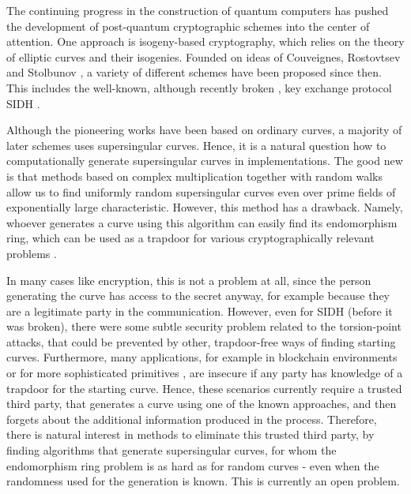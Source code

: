 The continuing progress in the construction of quantum computers has pushed the development of post-quantum cryptographic schemes into the center of attention.
One approach is isogeny-based cryptography, which relies on the theory of elliptic curves and their isogenies.
Founded on ideas of Couveignes, Rostovtsev and Stolbunov \cite{old_isogeny_crypto1, old_isogeny_crypto2, old_isogeny_crypto3}, a variety of different schemes have been proposed since then.
This includes the well-known, although recently broken \cite{sidh_broken}, key exchange protocol SIDH \cite{sidh}.

Although the pioneering works have been based on ordinary curves, a majority of later schemes uses supersingular curves.
Hence, it is a natural question how to computationally generate supersingular curves in implementations.
The good new is that methods based on complex multiplication \cite{constructing_supersingular_curves} together with random walks allow us to find uniformly random supersingular curves even over prime fields of exponentially large characteristic.
However, this method has a drawback.
Namely, whoever generates a curve using this algorithm can easily find its endomorphism ring, which can be used as a trapdoor for various cryptographically relevant problems \cite{endomorphism_ring_isogeny_path_equivalent}.

In many cases like encryption, this is not a problem at all, since the person generating the curve has access to the secret anyway, for example because they are a legitimate party in the communication.
However, even for SIDH (before it was broken), there were some subtle security problem related to the torsion-point attacks, that could be prevented by other, trapdoor-free ways of finding starting curves.
Furthermore, many applications, for example in blockchain environments or for more sophisticated primitives \cite{verifiable_delay_function, torsion_point_problem2}, are insecure if any party has knowledge of a trapdoor for the starting curve.
Hence, these scenarios currently require a trusted third party, that generates a curve using one of the known approaches, and then forgets about the additional information produced in the process.
Therefore, there is natural interest in methods to eliminate this trusted third party, by finding algorithms that generate supersingular curves, for whom the endomorphism ring problem is as hard as for random curves - even when the randomness used for the generation is known.
This is currently an open problem.


